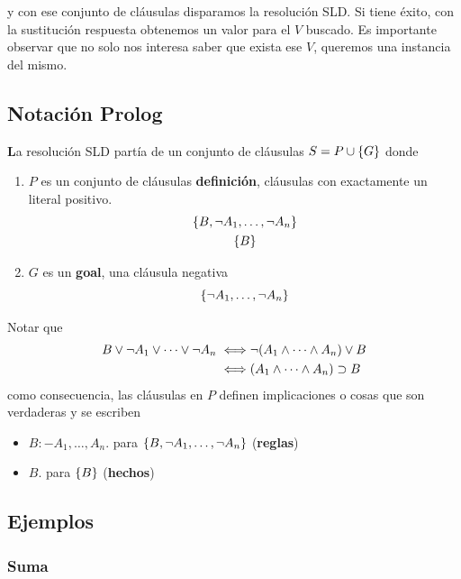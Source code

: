 \documentclass{report}
\theoremstyle{definition} %
\newenvironment{nota}[1]
    {\begin{leftbar}\textbf{#1}}
    {\end{leftbar}}
\begin{document}
y con ese conjunto de cláusulas disparamos la resolución SLD. Si tiene éxito,
con la sustitución respuesta obtenemos un valor para el $V$ buscado. Es
importante observar que no solo nos interesa saber que exista ese $V$, queremos
una instancia del mismo.

\subsection{Notación Prolog}

\begin{nota}
    La resolución SLD partía de un conjunto de cláusulas $S = P \cup \{ G \}$
    donde
    
    \begin{enumerate}
        \item $P$ es un conjunto de cláusulas \textbf{definición}, cláusulas con
        exactamente un literal positivo.
        \begin{gather*}
            \{ B, \neg A_1, \dots, \neg A_n \}\\
            \{ B \}
        \end{gather*}
        \item $G$ es un \textbf{goal}, una cláusula negativa
        \[
            \{ \neg A_1, \dots, \neg A_n \}
        \]
    \end{enumerate}
\end{nota}

Notar que
\begin{align*}
    B \vee \neg A_1 \vee \dots \vee \neg A_n
    \iff &\neg(A_1 \wedge \dots \wedge A_n) \vee B\\
    \iff &(A_1 \wedge \dots \wedge A_n) \supset B
\end{align*}
como consecuencia, las cláusulas en $P$ definen implicaciones o cosas que son
verdaderas y se escriben
\begin{itemize}
    \item $B :- A_1, \dots, A_n.$ para
    $\{ B, \neg A_1, \dots, \neg A_n \}$ (\textbf{reglas})
    \item $B.$ para $\{ B \}$ (\textbf{hechos})
\end{itemize}

\subsection{Ejemplos}

\subsubsection{Suma}
\end{document}
